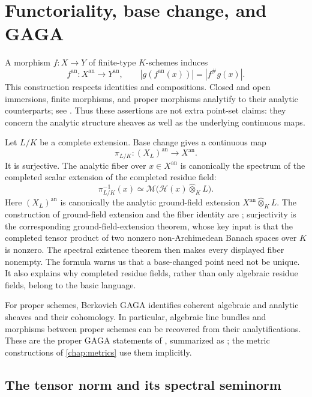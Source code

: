 \section{Functoriality, base change, and GAGA}
\label{sec:berk-functoriality}

A morphism $f:X\to Y$ of finite-type $K$-schemes induces
\[
 f^{\mathrm{an}}:X^{\mathrm{an}}\longrightarrow Y^{\mathrm{an}},
 \qquad
 |g(f^{\mathrm{an}}(x))|=|f^\#g(x)|.
\]
This construction respects identities and compositions. Closed and open
immersions, finite morphisms, and proper morphisms analytify to their
analytic counterparts; see
\cite[Fact~5.1.2.1]{Temkin2015Berkovich}.  Thus these assertions are not
extra point-set claims: they concern the analytic structure sheaves as
well as the underlying continuous maps.

Let $L/K$ be a complete extension. Base change gives a continuous map
\[
 \pi_{L/K}:(X_L)^{\mathrm{an}}\longrightarrow X^{\mathrm{an}}.
\]
It is surjective. The analytic fiber over $x\in X^{\mathrm{an}}$ is
canonically the spectrum of the completed scalar extension of the completed
residue field:
\[
              \pi_{L/K}^{-1}(x)\simeq
              \mathcal M\bigl(\mathcal H(x)\widehat\otimes_K L\bigr).
\]
Here $(X_L)^{\mathrm{an}}$ is canonically the analytic ground-field
extension $X^{\mathrm{an}}\widehat\otimes_KL$.  The construction of
ground-field extension and the fiber identity are
\cite[Definition/Exercise~4.1.7.1]{Temkin2015Berkovich}; surjectivity is
the corresponding ground-field-extension theorem, whose key input is that
the completed tensor product of two nonzero non-Archimedean Banach spaces
over $K$ is nonzero.  The spectral existence theorem
\cite[Theorem~1.2.1]{Berk12} then makes every displayed fiber nonempty.
The formula warns us that a base-changed point need not be unique. It also
explains why completed residue fields, rather than only algebraic residue
fields, belong to the basic language.

For proper schemes, Berkovich GAGA identifies coherent algebraic and
analytic sheaves and their cohomology. In particular, algebraic line
bundles and morphisms between proper schemes can be recovered from their
analytifications.  These are the proper GAGA statements of
\cite[\S\S3.4--3.5]{Berk12}, summarized as
\cite[Facts~5.1.2.1--5.1.2.4]{Temkin2015Berkovich}; the metric
constructions of \cref{chap:metrics} use them implicitly.

\subsection{The tensor norm and its spectral seminorm}
\label{subsec:berk-tensor-spectral}

